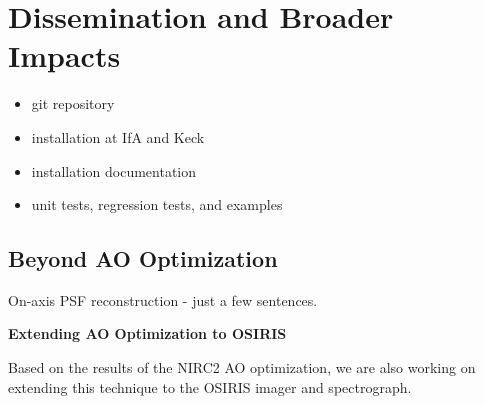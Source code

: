 \section{Dissemination and Broader Impacts}
\label{sec:dissemination}

\begin{itemize}
\item git repository
\item installation at IfA and Keck
\item installation documentation
\item unit tests, regression tests, and examples
\end{itemize}

\subsection{Beyond AO Optimization}

On-axis PSF reconstruction - just a few sentences.

\textbf{Extending AO Optimization to OSIRIS}
\label{sec:osiris}

Based on the results of the NIRC2 AO optimization, we are also working on extending this technique to the OSIRIS imager and spectrograph. 
